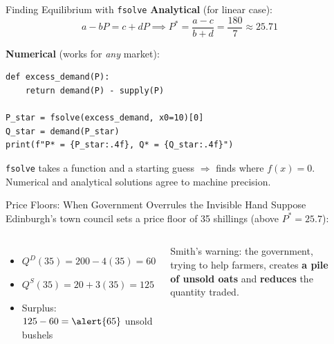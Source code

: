 \documentclass[aspectratio=169, 10pt]{beamer}
\begin{document}
\begin{frame}[fragile]{Finding Equilibrium with \texttt{fsolve}}
\textbf{Analytical} (for linear case):
\[
  a - bP = c + dP \implies P^* = \frac{a - c}{b + d} = \frac{180}{7} \approx 25.71
\]

\textbf{Numerical} (works for \textit{any} market):
\begin{lstlisting}
def excess_demand(P):
    return demand(P) - supply(P)

P_star = fsolve(excess_demand, x0=10)[0]
Q_star = demand(P_star)
print(f"P* = {P_star:.4f}, Q* = {Q_star:.4f}")
\end{lstlisting}
\vspace{0.3em}
\texttt{fsolve} takes a function and a starting guess $\Rightarrow$
finds where $f(x) = 0$.\\[4pt]
Numerical and analytical solutions agree to machine precision.
\end{frame}

\begin{frame}{Price Floors: When Government Overrules the Invisible Hand}
Suppose Edinburgh's town council sets a \alert{price floor} of 35 shillings
(above $P^* = 25.7$):
\vspace{0.5em}
\begin{columns}[T]
\begin{itemize}
  \item $Q^D(35) = 200 - 4(35) = 60$
  \item $Q^S(35) = 20 + 3(35) = 125$
  \item Surplus: $125 - 60 = \alert{65}$ unsold bushels
\end{itemize}
\vspace{0.5em}
Smith's warning: the government, trying to help farmers, creates
\textbf{a pile of unsold oats} and \textbf{reduces} the quantity traded.
\begin{center}
\end{center}
\end{columns}
\end{frame}
\end{document}
